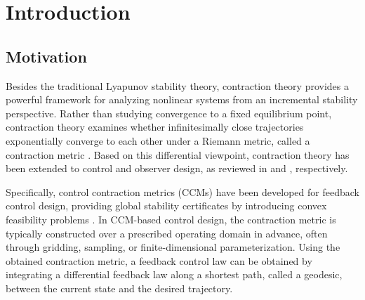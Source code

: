 \documentclass{ifacconf}
\begin{document}
\begin{frontmatter}










\end{frontmatter}

\section{Introduction}

\subsection{Motivation}

Besides the traditional Lyapunov stability theory, contraction theory provides a powerful framework for analyzing nonlinear systems from an incremental stability perspective.
Rather than studying convergence to a fixed equilibrium point, contraction theory examines whether infinitesimally close trajectories exponentially converge to each other under a Riemann metric, called a contraction metric \cite{LOHMILLER:1998aa}.
Based on this differential viewpoint, contraction theory has been extended to control and observer design, as reviewed in \cite{Tsukamoto:2021aa} and \cite{Bernard:2022aa}, respectively.

Specifically, control contraction metrics (CCMs) have been developed for feedback control design, providing global stability certificates by introducing convex feasibility problems \cite{Manchester:2014aa,Manchester:2017aa}.
In CCM-based control design, the contraction metric is typically constructed over a prescribed operating domain in advance, often through gridding, sampling, or finite-dimensional parameterization.
Using the obtained contraction metric, a feedback control law can be obtained by integrating a differential feedback law along a shortest path, called a geodesic, between the current state and the desired trajectory.
\end{document}
